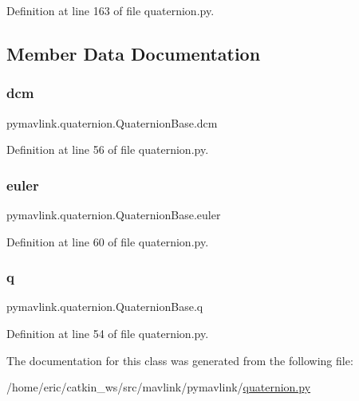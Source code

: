 Definition at line 163 of file quaternion.\+py.



\subsection{Member Data Documentation}
\mbox{\label{classpymavlink_1_1quaternion_1_1QuaternionBase_aaba200ee55a36ebaa3c8db02513a1cfe}} 
\subsubsection{\texorpdfstring{dcm}{dcm}}
{\footnotesize\ttfamily pymavlink.\+quaternion.\+Quaternion\+Base.\+dcm}



Definition at line 56 of file quaternion.\+py.

\mbox{\label{classpymavlink_1_1quaternion_1_1QuaternionBase_a61484badb48116df5bafd66da24b3c02}} 
\subsubsection{\texorpdfstring{euler}{euler}}
{\footnotesize\ttfamily pymavlink.\+quaternion.\+Quaternion\+Base.\+euler}



Definition at line 60 of file quaternion.\+py.

\mbox{\label{classpymavlink_1_1quaternion_1_1QuaternionBase_a392dcd8a214e33c00791e9fb655612b8}} 
\subsubsection{\texorpdfstring{q}{q}}
{\footnotesize\ttfamily pymavlink.\+quaternion.\+Quaternion\+Base.\+q}



Definition at line 54 of file quaternion.\+py.



The documentation for this class was generated from the following file\+:\begin{DoxyCompactItemize}
\item 
/home/eric/catkin\+\_\+ws/src/mavlink/pymavlink/\mbox{\hyperlink{quaternion_8py}{quaternion.\+py}}\end{DoxyCompactItemize}
